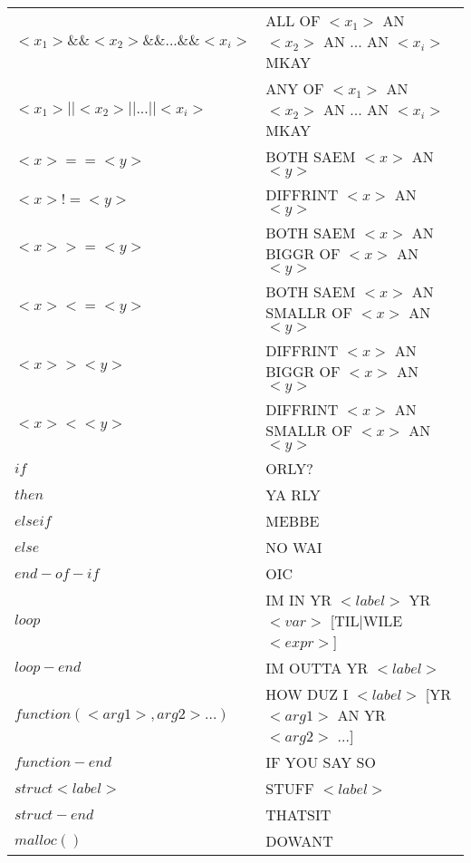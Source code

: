 \documentclass[draft]{llncs}
\begin{document}
\begin{table}[h]
\begin{center}
\begin{tabular}{ll}
$ <x_{1}> \&\& <x_{2}> \&\& ... \&\& <x_{i}> $& ALL OF $<x_{1}>$ AN $<x_{2}>$ AN ... AN $<x_{i}>$ MKAY \\
$ <x_{1}> || <x_{2}> || ... || <x_{i}> $& ANY OF $<x_{1}>$ AN $<x_{2}>$ AN ... AN $<x_{i}>$ MKAY \\

$ <x> == <y> $& BOTH SAEM $<x>$ AN $<y> $ \\
$ <x> != <y> $& DIFFRINT $<x>$ AN $<y> $ \\
$ <x> >= <y> $& BOTH SAEM $<x>$ AN BIGGR OF $<x>$ AN $<y> $ \\
$ <x> <= <y> $& BOTH SAEM $<x>$ AN SMALLR OF $<x>$ AN $<y> $ \\

$ <x> > <y> $& DIFFRINT $<x>$ AN BIGGR OF $<x>$ AN $<y>$ \\
$ <x> < <y> $& DIFFRINT $<x>$ AN SMALLR OF $<x>$ AN $<y>$ \\



$ if $& ORLY? \\
$ then $& YA RLY \\
$ else if $& MEBBE \\
$ else $& NO WAI \\
$ end-of-if $& OIC \\

$ loop $& IM IN YR $<label>$ YR $<var>$ [TIL|WILE $<expr>$] \\
$ loop-end $& IM OUTTA YR $<label> $ \\

$ function(<arg1>,arg2>...) $& HOW DUZ I $<label>$ [YR $<arg1>$ AN YR $<arg2>$ ...] \\
$ function-end $& IF YOU SAY SO \\

$ struct <label> $& STUFF $<label>$ \\
$ struct-end $& THATSIT \\

$ malloc() $& DOWANT \\

\bottomrule
	\end{tabular}
	\label{tab:syntax}
\end{center}
\end{table}
\end{document}
